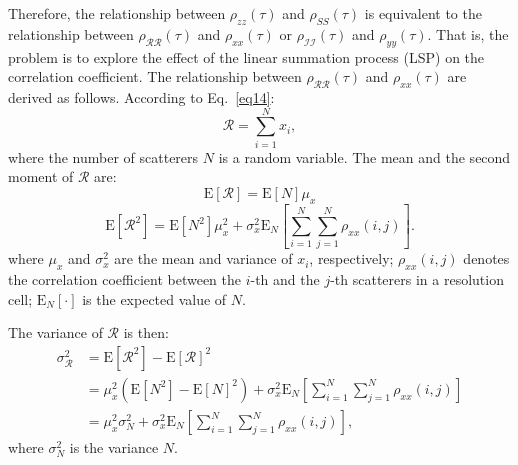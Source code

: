 \documentclass[journal]{IEEEtran}
\begin{document}
Therefore, the relationship between $\rho_{z z}(\tau)$ and $\rho_{S S}(\tau)$ is equivalent to the relationship between $\rho_{\mathcal{R} \mathcal{R}}(\tau)$ and $\rho_{x x}(\tau)$ or $\rho_{\mathcal{I} \mathcal{I}}(\tau)$ and $\rho_{y y}(\tau)$.
That is, the problem is to explore the effect of the linear summation process (LSP) on the correlation coefficient.
The relationship between $\rho_{\mathcal{R} \mathcal{R}}(\tau)$ and $\rho_{x x}(\tau)$ are derived as follows. According to Eq.~\eqref{eq14}:
\begin{equation}
\mathcal{R}=\sum_{i=1}^{N} x_{i} \nonumber,
\end{equation}
where the number of scatterers $N$ is a random variable.
The mean and the second moment of $\mathcal{R}$ are:
\begin{equation}
\mathrm{E}\left[\mathcal{R}\right]=\mathrm{E}\left[N\right] \mu_{x}
\label{eq20}
\end{equation}
\begin{equation}
\mathrm{E}\left[\mathcal{R}^{2}\right]=\mathrm{E}\left[N^{2}\right] \mu_{x}^{2}+\sigma_{x}^{2} \mathrm{E}_{N}\left[\sum_{i=1}^{N} \sum_{j=1}^{N} \rho_{x x}(i, j)\right].
\label{eq21}
\end{equation}
where $\mu_{x}$ and $\sigma_{x}^{2}$ are the mean and variance of $x_i$, respectively; $\rho_{x x}(i,j)$ denotes the correlation coefficient between the $i$-th and the $j$-th scatterers in a resolution cell; $\mathrm{E}_{N}\left[ \cdot \right]$ is the expected value of $N$.

The variance of $\mathcal{R}$ is then:
\begin{equation}
\begin{split}
\sigma_{\mathcal{R}}^{2} & = \mathrm{E}\left[\mathcal{R}^{2}\right]-\mathrm{E}\left[\mathcal{R}\right]
^2   \\
& = \mu_{x}^{2}\left(\mathrm{E}\left[N^{2}\right]-\mathrm{E}[N]^{2}\right)+\sigma_{x}^{2} \mathrm{E}_{N}\left[\sum_{i=1}^{N} \sum_{j=1}^{N} \rho_{x x}(i, j)\right] \\
& = \mu_{x}^{2}\sigma_{N}^{2}+\sigma_{x}^{2} \mathrm{E}_{N}\left[\sum_{i=1}^{N} \sum_{j=1}^{N} \rho_{x x}(i, j)\right],
\label{eq22}
\end{split}
\end{equation}
where $\sigma_{N}^{2}$ is the variance $N$.
\end{document}
